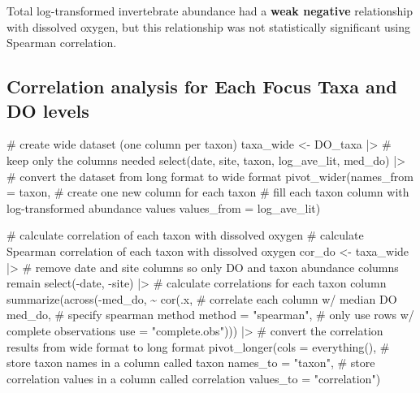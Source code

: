 \documentclass[
  letterpaper,
  DIV=11,
  numbers=noendperiod]{scrartcl}
\newenvironment{Shaded}{\begin{snugshade}}{\end{snugshade}}
\newcommand{\AttributeTok}[1]{\textcolor[rgb]{0.40,0.45,0.13}{#1}}
\newcommand{\CommentTok}[1]{\textcolor[rgb]{0.37,0.37,0.37}{#1}}
\newcommand{\FunctionTok}[1]{\textcolor[rgb]{0.28,0.35,0.67}{#1}}
\newcommand{\NormalTok}[1]{\textcolor[rgb]{0.00,0.23,0.31}{#1}}
\newcommand{\OtherTok}[1]{\textcolor[rgb]{0.00,0.23,0.31}{#1}}
\newcommand{\SpecialCharTok}[1]{\textcolor[rgb]{0.37,0.37,0.37}{#1}}
\newcommand{\StringTok}[1]{\textcolor[rgb]{0.13,0.47,0.30}{#1}}
\begin{document}
Total log-transformed invertebrate abundance had a \textbf{weak
negative} relationship with dissolved oxygen, but this relationship was
not statistically significant using Spearman correlation.

\subsection{Correlation analysis for Each Focus Taxa and DO
levels}\label{correlation-analysis-for-each-focus-taxa-and-do-levels}

\begin{Shaded}
\begin{Highlighting}[]
\CommentTok{\# create wide dataset (one column per taxon)}
\NormalTok{taxa\_wide }\OtherTok{\textless{}{-}}\NormalTok{ DO\_taxa }\SpecialCharTok{|\textgreater{}}
  \CommentTok{\# keep only the columns needed }
  \FunctionTok{select}\NormalTok{(date, site, taxon, log\_ave\_lit, med\_do) }\SpecialCharTok{|\textgreater{}}
  \CommentTok{\# convert the dataset from long format to wide format}
  \FunctionTok{pivot\_wider}\NormalTok{(}\AttributeTok{names\_from =}\NormalTok{ taxon, }\CommentTok{\# create one new column for each taxon}
              \CommentTok{\# fill each taxon column with log{-}transformed abundance values}
              \AttributeTok{values\_from =}\NormalTok{ log\_ave\_lit)}

\CommentTok{\# calculate correlation of each taxon with dissolved oxygen}
\CommentTok{\# calculate Spearman correlation of each taxon with dissolved oxygen}
\NormalTok{cor\_do }\OtherTok{\textless{}{-}}\NormalTok{ taxa\_wide }\SpecialCharTok{|\textgreater{}}
  \CommentTok{\# remove date and site columns so only DO and taxon abundance columns remain}
  \FunctionTok{select}\NormalTok{(}\SpecialCharTok{{-}}\NormalTok{date, }\SpecialCharTok{{-}}\NormalTok{site) }\SpecialCharTok{|\textgreater{}}
  \CommentTok{\# calculate correlations for each taxon column}
  \FunctionTok{summarize}\NormalTok{(}\FunctionTok{across}\NormalTok{(}\SpecialCharTok{{-}}\NormalTok{med\_do, }\SpecialCharTok{\textasciitilde{}} \FunctionTok{cor}\NormalTok{(.x,}
                                  \CommentTok{\# correlate each column w/ median DO}
\NormalTok{                                  med\_do,}
                                  \CommentTok{\# specify spearman method}
                                  \AttributeTok{method =} \StringTok{"spearman"}\NormalTok{,}
                                  \CommentTok{\# only use rows w/ complete observations }
                                  \AttributeTok{use =} \StringTok{"complete.obs"}\NormalTok{))) }\SpecialCharTok{|\textgreater{}}
  \CommentTok{\# convert the correlation results from wide format to long format}
  \FunctionTok{pivot\_longer}\NormalTok{(}\AttributeTok{cols =} \FunctionTok{everything}\NormalTok{(),}
               \CommentTok{\# store taxon names in a column called taxon}
               \AttributeTok{names\_to =} \StringTok{"taxon"}\NormalTok{, }
               \CommentTok{\# store correlation values in a column called correlation}
               \AttributeTok{values\_to =} \StringTok{"correlation"}\NormalTok{)}


\end{Highlighting}
\end{Shaded}
\end{document}

